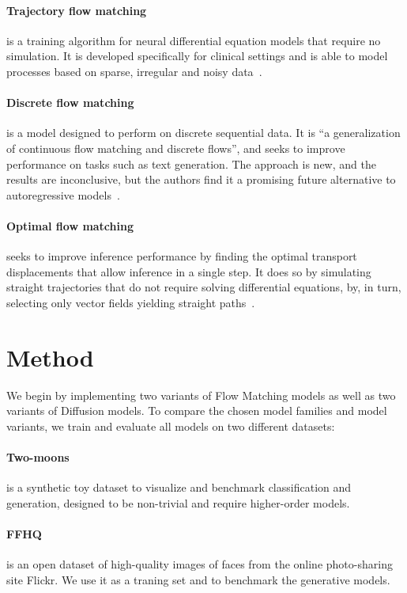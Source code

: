 \documentclass{article}
\begin{document}
\paragraph{Trajectory flow matching} is a training algorithm for neural differential equation models that require no simulation. It is developed specifically for clinical settings and is able to model processes based on sparse, irregular and noisy data~\cite{zhang2024trajectory}.

\paragraph{Discrete flow matching} is a model designed to perform on discrete sequential data. It is ``a generalization of continuous flow matching and discrete flows'', and seeks to improve performance on tasks such as text generation. The approach is new, and the results are inconclusive, but the authors find it a promising future alternative to autoregressive models~\cite{gat2024discrete}.

\paragraph{Optimal flow matching} seeks to improve inference performance by finding the optimal transport displacements that allow inference in a single step. It does so by simulating straight trajectories that do not require solving differential equations, by, in turn, selecting only vector fields yielding straight paths~\cite{kornilov2024optimal}.

\section{Method}

We begin by implementing two variants of Flow Matching models as well as two variants of Diffusion models. To compare the chosen model families and model variants, we train and evaluate all models on two different datasets:

\paragraph{Two-moons} is a synthetic toy dataset to visualize and benchmark classification and generation, designed to be non-trivial and require higher-order models.

\paragraph{FFHQ} is an open dataset of high-quality images of faces from the online photo-sharing site Flickr. We use it as a traning set and to benchmark the generative models.
\end{document}
